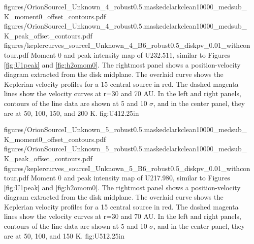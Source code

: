 \documentclass[twocolumn]{aastex61}
\begin{document}
\FigureThree
{{figures/OrionSourceI_Unknown_4_robust0.5.maskedclarkclean10000_medsub_K_moment0_offset_contours}.pdf}
{{figures/OrionSourceI_Unknown_4_robust0.5.maskedclarkclean10000_medsub_K_peak_offset_contours}.pdf}
{{figures/keplercurves_sourceI_Unknown_4_B6_robust0.5_diskpv_0.01_withcontour}.pdf}
{Moment 0 and peak intensity map of U232.511, similar to Figures \ref{fig:U1peak} and \ref{fig:h2omom0}.
The rightmost panel shows a position-velocity diagram extracted from the disk midplane.
The overlaid  curve shows the Keplerian velocity profiles for a 15 \msun central source in red.
The dashed magenta lines show the velocity curves at r=30 and 70 AU.
In the left and right panels, contours of the line data are shown at 5 and 10 $\sigma$,
and in the center panel, they are at 50, 100, 150, and 200 K.
}
{fig:U4}{1}{2.25in}

\FigureThree
{{figures/OrionSourceI_Unknown_5_robust0.5.maskedclarkclean10000_medsub_K_moment0_offset_contours}.pdf}
{{figures/OrionSourceI_Unknown_5_robust0.5.maskedclarkclean10000_medsub_K_peak_offset_contours}.pdf}
{{figures/keplercurves_sourceI_Unknown_5_B6_robust0.5_diskpv_0.01_withcontour}.pdf}
{Moment 0 and peak intensity map of U217.980, similar to Figures \ref{fig:U1peak} and \ref{fig:h2omom0}.
The rightmost panel shows a position-velocity diagram extracted from the disk midplane.
The overlaid  curve shows the Keplerian velocity profiles for a 15 \msun central source in red.
The dashed magenta lines show the velocity curves at r=30 and 70 AU.
In the left and right panels, contours of the line data are shown at 5 and 10 $\sigma$,
and in the center panel, they are at 50, 100, and 150 K.
}
{fig:U5}{1}{2.25in}
\end{document}
